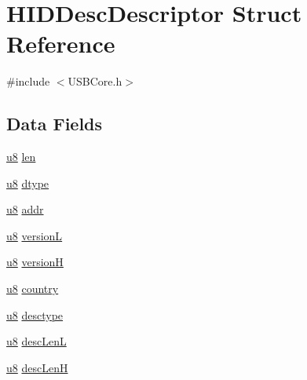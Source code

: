 \hypertarget{struct_h_i_d_desc_descriptor}{}\section{H\+I\+D\+Desc\+Descriptor Struct Reference}
\label{struct_h_i_d_desc_descriptor}


{\ttfamily \#include $<$U\+S\+B\+Core.\+h$>$}

\subsection*{Data Fields}
\begin{DoxyCompactItemize}
\item 
\hyperlink{_u_s_b_a_p_i_8h_aed742c436da53c1080638ce6ef7d13de}{u8} \hyperlink{struct_h_i_d_desc_descriptor_afbf3f3230446569534d5f466aaf4c23b}{len}
\item 
\hyperlink{_u_s_b_a_p_i_8h_aed742c436da53c1080638ce6ef7d13de}{u8} \hyperlink{struct_h_i_d_desc_descriptor_a0bb419531ec75697e63e9109fecf81b0}{dtype}
\item 
\hyperlink{_u_s_b_a_p_i_8h_aed742c436da53c1080638ce6ef7d13de}{u8} \hyperlink{struct_h_i_d_desc_descriptor_a7394c0f7cac587defeae4e84d34fb535}{addr}
\item 
\hyperlink{_u_s_b_a_p_i_8h_aed742c436da53c1080638ce6ef7d13de}{u8} \hyperlink{struct_h_i_d_desc_descriptor_abbe47c1ab026892a2d5ed0c8690f63c4}{version\+L}
\item 
\hyperlink{_u_s_b_a_p_i_8h_aed742c436da53c1080638ce6ef7d13de}{u8} \hyperlink{struct_h_i_d_desc_descriptor_a25c3b37fcec9c0b6cd0b3aaa62c904f0}{version\+H}
\item 
\hyperlink{_u_s_b_a_p_i_8h_aed742c436da53c1080638ce6ef7d13de}{u8} \hyperlink{struct_h_i_d_desc_descriptor_adf7dd313d5179831aef0bd2c06e7fb37}{country}
\item 
\hyperlink{_u_s_b_a_p_i_8h_aed742c436da53c1080638ce6ef7d13de}{u8} \hyperlink{struct_h_i_d_desc_descriptor_ab7b17f5a1f2d18b4fb7f406b6b80d8be}{desctype}
\item 
\hyperlink{_u_s_b_a_p_i_8h_aed742c436da53c1080638ce6ef7d13de}{u8} \hyperlink{struct_h_i_d_desc_descriptor_ab79e949a76fd9f11acbeda14f76b41d6}{desc\+Len\+L}
\item 
\hyperlink{_u_s_b_a_p_i_8h_aed742c436da53c1080638ce6ef7d13de}{u8} \hyperlink{struct_h_i_d_desc_descriptor_acb9cb52171317c0ea8140dd491c0d00e}{desc\+Len\+H}
\end{DoxyCompactItemize}


